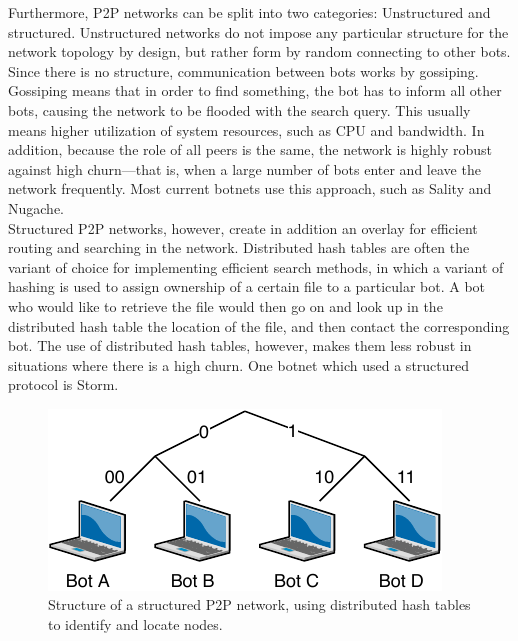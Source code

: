 \documentclass[10pt, a4paper, twocolumn]{article} %
\begin{document}
Furthermore, P2P networks can be split into two categories: Unstructured and structured. Unstructured networks do not impose any particular structure for the network topology by design, but rather form by random connecting to other bots. Since there is no structure, communication between bots works by gossiping. Gossiping means that in order to find something, the bot has to inform all other bots, causing the network to be flooded with the search query. This usually means higher utilization of system resources, such as CPU and bandwidth. In addition, because the role of all peers is the same, the network is highly robust against high churn---that is, when a large number of bots enter and leave the network frequently. Most current botnets use this approach, such as Sality and Nugache.\\

Structured P2P networks, however, create in addition an overlay for efficient routing and searching in the network. Distributed hash tables are often the variant of choice for implementing efficient search methods, in which a variant of hashing is used to assign ownership of a certain file to a particular bot. A bot who would like to retrieve the file would then go on and look up in the distributed hash table the location of the file, and then contact the corresponding bot. The use of distributed hash tables, however, makes them less robust in situations where there is a high churn. One botnet which used a structured protocol is Storm.
\begin{figure}[ht]
  \centering
  \includegraphics[width=\linewidth]{figures/structured}
  \caption{Structure of a structured P2P network, using distributed hash tables to identify and locate nodes.}
\end{figure}
\pagebreak
\end{document}
